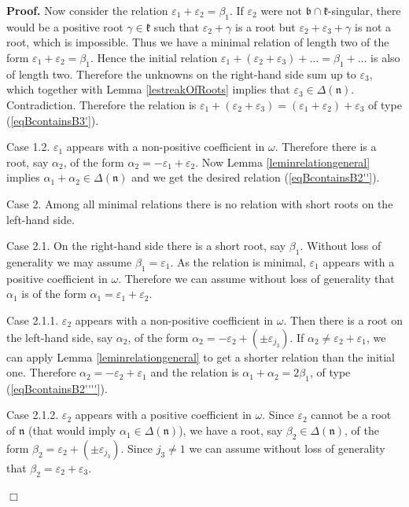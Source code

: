 \documentclass[12pt]{report}
\newenvironment{proof}[1][]{ \textbf{Proof#1. }}{$\Box$\medskip}
\newcommand{\kk}{\mathfrak{k}}
\newcommand{\nn}{\mathfrak{n}}
\newcommand{\bb}{\mathfrak{b}}
\newcommand{\refle}[1]{Lemma \ref{#1}}
\newcommand{\refeq}[1]{(\ref{#1})}
\newcommand{\eps}{\varepsilon}
\newcommand{\pmf}[1]{ \pm}%
\begin{document}
\begin{proof}
Now consider the relation $\eps_1+\eps_2=\beta_1$. If $\eps_2$ were not $\bb\cap\kk$-singular, there would be a positive root $\gamma\in\kk$ such that $\eps_2+\gamma$ is a root but $\eps_2+\eps_3+\gamma$ is not a root, which is impossible. Thus we have a minimal relation of length two of the form $\eps_1+\eps_2=\beta_1$. Hence the initial relation $\eps_1+(\eps_2+\eps_3)+\dots=\beta_1+\dots$ is also of length two. Therefore the unknowns on the right-hand side sum up to $\eps_3$, which together with Lemma \ref{lestreakOfRoots} implies that $\eps_3\in\Delta(\nn)$. Contradiction. Therefore the relation is $\eps_1+(\eps_2 +\eps_3) = (\eps_1+ \eps_2)+\eps_3$ of type \refeq{eqBcontainsB3'}.

\noindent Case 1.2. $\eps_{1}$ appears with a non-positive coefficient in $\omega$. Therefore there is a root, say $\alpha_2$, of the form $\alpha_2=-\eps_{1}+\eps_{2}$. Now \refle{leminrelationgeneral} implies $\alpha_1+\alpha_2\in\Delta(\nn)$ and we get the desired relation \refeq{eqBcontainsB2''}.

\noindent Case 2. Among all minimal relations there is no relation with short roots on the left-hand side. 

\noindent Case 2.1. On the right-hand side there is a short root, say $\beta_1$. Without loss of generality we may assume $\beta_1= \eps_{1}$. As the relation is minimal, $\eps_{1}$  appears with a positive coefficient in $\omega$. Therefore we can assume without loss of generality that $\alpha_1$ is of the form $\alpha_1= \eps_{1}+ \eps_{2}$.

\noindent Case 2.1.1. $\eps_{2}$ appears with a non-positive coefficient in $\omega$. Then there is a root on the left-hand side, say $\alpha_2$, of the form $\alpha_2= -\eps_{2}+(\pmf{j_3}\eps_{j_3})$. If $\alpha_2\neq \eps_2+\eps_1$, we can apply Lemma \ref{leminrelationgeneral} to get a shorter relation than the initial one. Therefore $\alpha_2=-\eps_2+\eps_1$ and the relation is $\alpha_1+\alpha_2=2\beta_1$, of type \refeq{eqBcontainsB2''''}.

\noindent Case 2.1.2. $\eps_{2}$ appears with a positive coefficient in $\omega$. Since $ \eps_{2}$ cannot be a root of $\nn$ (that would imply $\alpha_1\in\Delta(\nn)$), we have a root, say $\beta_2\in\Delta(\nn)$, of the form $\beta_2=\eps_{2}+(\pmf{j_3}\eps_{j_3})$. Since $j_3\neq 1$ we can assume without loss of generality that $\beta_2=\eps_2+\eps_3$. 


\end{proof}
\end{document}
